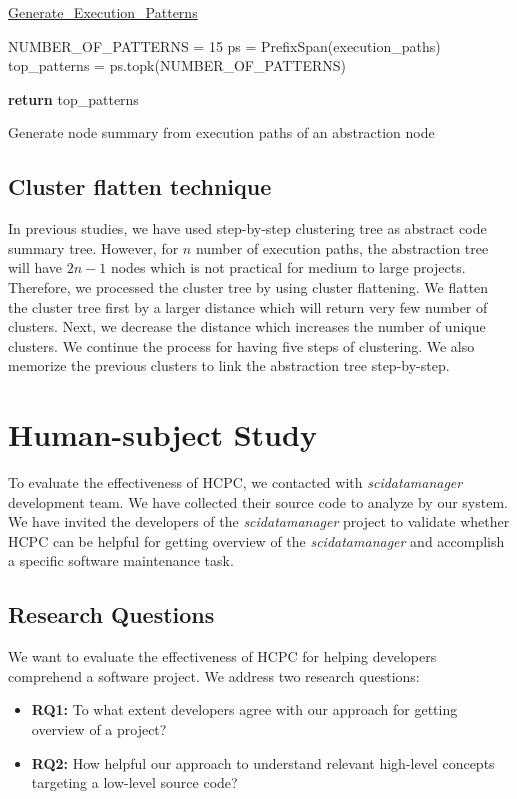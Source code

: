 \begin{algorithm}
    
    \underline{Generate\_Execution\_Patterns} 
    
    NUMBER\_OF\_PATTERNS = 15\;
    ps = PrefixSpan(execution\_paths)\;
    top\_patterns = ps.topk(NUMBER\_OF\_PATTERNS)\; 
    
    \textbf{return} top\_patterns\;
    \caption{Generate node summary from execution paths of an abstraction node}
    \label{alg:execution_patterns}
\end{algorithm}


\subsection{Cluster flatten technique}

In previous studies, we have used step-by-step clustering tree as abstract code summary tree. However, for $n$ number of execution paths, the abstraction tree will have $2n - 1$ nodes which is not practical for medium to large projects. Therefore, we processed the cluster tree by using cluster flattening. We flatten the cluster tree first by a larger distance which will return very few number of clusters. Next, we decrease the distance which increases the number of unique clusters. We continue the process for having five steps of clustering. We also memorize the previous clusters to link the abstraction tree step-by-step.


\section{Human-subject Study}
\label{hla3:human_study}
To evaluate the effectiveness of HCPC, we contacted with \emph{scidatamanager} development team. We have collected their source code to analyze by our system. We have invited the developers of the \emph{scidatamanager} project to validate whether HCPC can be helpful for getting overview of the \emph{scidatamanager} and accomplish a specific software maintenance task.

\subsection{Research Questions}
\label{hla3:evaluation}
We want to evaluate the effectiveness of HCPC for helping developers comprehend a software project. We address two research questions:
\begin{itemize}
    \item \textbf{RQ1:} To what extent developers agree with our approach for getting overview of a project?
    \item \textbf{RQ2:} How helpful our approach to understand relevant high-level concepts targeting a low-level source code?
\end{itemize}
